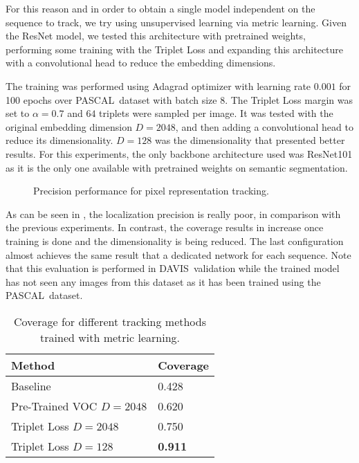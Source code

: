 For this reason and in order to obtain a single model independent on the sequence to track, we try using unsupervised learning  via metric learning.
Given the ResNet model, we tested this architecture with pretrained weights, performing some training with the Triplet Loss and expanding this architecture with a convolutional head to reduce the embedding dimensions.

The training was performed using Adagrad optimizer with learning rate $0.001$ for 100 epochs over PASCAL~\pascal dataset with batch size $8$.
The Triplet Loss margin was set to $\alpha = 0.7$ and $64$ triplets were sampled per image.
It was tested with the original embedding dimension $D=2048$, and then adding a convolutional head to reduce its dimensionality.
$D=128$ was the dimensionality that presented better results.
For this experiments, the only backbone architecture used was ResNet101 as it is the only one available with pretrained weights on semantic segmentation.


\begin{figure}[h]
  \centering
  
  \caption{Precision performance for pixel representation tracking.}
  \label{fig:tracking_metric_learning}
\end{figure}

As can be seen in , the localization precision is really poor, in comparison with the previous experiments.
In contrast, the coverage results in  increase once training is done and the dimensionality is being reduced. The last configuration almost achieves the same result that a dedicated network for each sequence.
Note that this evaluation is performed in DAVIS~\davislast validation while the trained model has not seen any images from this dataset as it has been trained using the PASCAL~\pascal dataset.


\begin{table}[h]
  \centering
  \begin{tabular}{l|l}
    \toprule
    Method                   & Coverage       \\
    \midrule
    Baseline                 & 0.428          \\
    Pre-Trained VOC $D=2048$ & 0.620          \\
    Triplet Loss $D=2048$    & 0.750          \\
    Triplet Loss $D=128$     & \textbf{0.911} \\
    \bottomrule
  \end{tabular}
  \caption{Coverage for different tracking methods trained with metric learning. }
  \label{tab:coverage_tracking_metric_learning}
\end{table}

